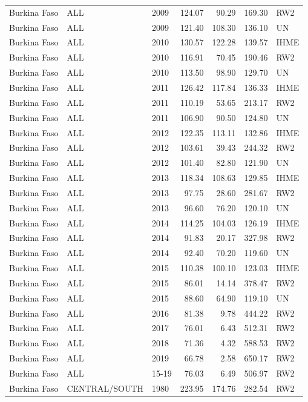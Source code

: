 \begin{longtable}{lllrrrl}
  Burkina Faso & ALL & 2009 & 124.07 & 90.29 & 169.30 & RW2 \\ 
  Burkina Faso & ALL & 2009 & 121.40 & 108.30 & 136.10 & UN \\ 
  Burkina Faso & ALL & 2010 & 130.57 & 122.28 & 139.57 & IHME \\ 
  Burkina Faso & ALL & 2010 & 116.91 & 70.45 & 190.46 & RW2 \\ 
  Burkina Faso & ALL & 2010 & 113.50 & 98.90 & 129.70 & UN \\ 
  Burkina Faso & ALL & 2011 & 126.42 & 117.84 & 136.33 & IHME \\ 
  Burkina Faso & ALL & 2011 & 110.19 & 53.65 & 213.17 & RW2 \\ 
  Burkina Faso & ALL & 2011 & 106.90 & 90.50 & 124.80 & UN \\ 
  Burkina Faso & ALL & 2012 & 122.35 & 113.11 & 132.86 & IHME \\ 
  Burkina Faso & ALL & 2012 & 103.61 & 39.43 & 244.32 & RW2 \\ 
  Burkina Faso & ALL & 2012 & 101.40 & 82.80 & 121.90 & UN \\ 
  Burkina Faso & ALL & 2013 & 118.34 & 108.63 & 129.85 & IHME \\ 
  Burkina Faso & ALL & 2013 & 97.75 & 28.60 & 281.67 & RW2 \\ 
  Burkina Faso & ALL & 2013 & 96.60 & 76.20 & 120.10 & UN \\ 
  Burkina Faso & ALL & 2014 & 114.25 & 104.03 & 126.19 & IHME \\ 
  Burkina Faso & ALL & 2014 & 91.83 & 20.17 & 327.98 & RW2 \\ 
  Burkina Faso & ALL & 2014 & 92.40 & 70.20 & 119.60 & UN \\ 
  Burkina Faso & ALL & 2015 & 110.38 & 100.10 & 123.03 & IHME \\ 
  Burkina Faso & ALL & 2015 & 86.01 & 14.14 & 378.47 & RW2 \\ 
  Burkina Faso & ALL & 2015 & 88.60 & 64.90 & 119.10 & UN \\ 
  Burkina Faso & ALL & 2016 & 81.38 & 9.78 & 444.22 & RW2 \\ 
  Burkina Faso & ALL & 2017 & 76.01 & 6.43 & 512.31 & RW2 \\ 
  Burkina Faso & ALL & 2018 & 71.36 & 4.32 & 588.53 & RW2 \\ 
  Burkina Faso & ALL & 2019 & 66.78 & 2.58 & 650.17 & RW2 \\ 
  Burkina Faso & ALL & 15-19 & 76.03 & 6.49 & 506.97 & RW2 \\ 
  Burkina Faso & CENTRAL/SOUTH & 1980 & 223.95 & 174.76 & 282.54 & RW2 \\ 

\end{longtable}
